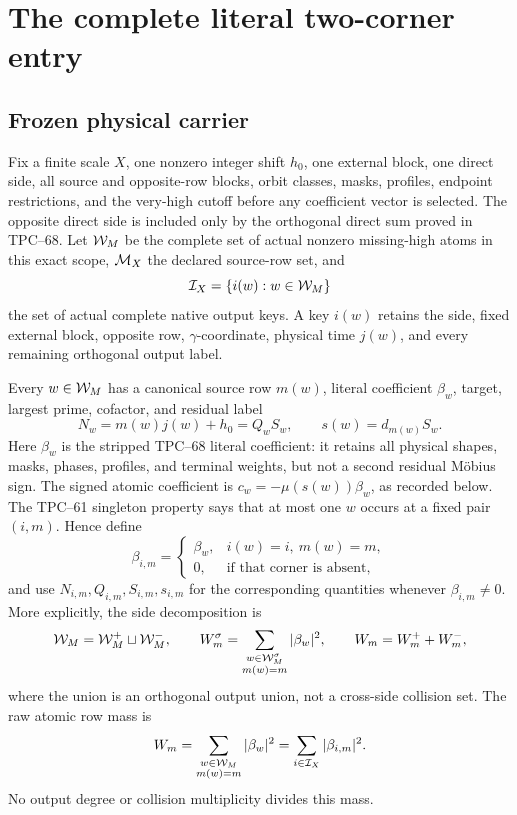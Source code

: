 \section{The complete literal two-corner entry}
\label{sec:literal-entry}

\subsection{Frozen physical carrier}

Fix a finite scale \(X\), one nonzero integer shift \(h_0\), one external
block, one direct side, all source and opposite-row blocks, orbit classes,
masks, profiles, endpoint restrictions, and the very-high cutoff before
any coefficient vector is selected.  The opposite direct side is included
only by the orthogonal direct sum proved in TPC--68.  Let \(\mathcal W_M\) be
the complete set of actual nonzero missing-high atoms in this exact scope,
\(\mathcal M_X\) the declared source-row set, and
\[
 \mathcal I_X=\{i(w):w\in\mathcal W_M\}
\]
the set of actual complete native output keys.  A key \(i(w)\) retains
the side, fixed external block, opposite row, \(\gamma\)-coordinate,
physical time \(j(w)\), and every remaining orthogonal output label.

Every \(w\in\mathcal W_M\) has a canonical source row \(m(w)\), literal
coefficient \(\beta_w\), target, largest prime, cofactor, and residual
label
\begin{equation}
 N_w=m(w)j(w)+h_0=Q_wS_w,
 \qquad
 s(w)=d_{m(w)}S_w.
 \label{eq:key-target-residual}
\end{equation}
Here \(\beta_w\) is the stripped TPC--68 literal coefficient: it retains
all physical shapes, masks, phases, profiles, and terminal weights, but
not a second residual M\"obius sign.  The signed atomic coefficient is
\(c_w=-\mu(s(w))\beta_w\), as recorded below.
The TPC--61 singleton property says that at most one \(w\) occurs at a
fixed pair \((i,m)\).  Hence define
\[
 \beta_{i,m}=
 \begin{cases}
  \beta_w,&i(w)=i,\ m(w)=m,\\
  0,&\text{if that corner is absent},
 \end{cases}
\]
and use \(N_{i,m},Q_{i,m},S_{i,m},s_{i,m}\) for the corresponding
quantities whenever \(\beta_{i,m}\ne0\).
More explicitly, the side decomposition is
\[
 \mathcal W_M=\mathcal W_M^+\sqcup\mathcal W_M^-,
 \qquad
 W_m^\sigma
 =\sum_{\substack{w\in\mathcal W_M^\sigma\\m(w)=m}}|\beta_w|^2,
 \qquad
 W_m=W_m^++W_m^-,
\]
where the union is an orthogonal output union, not a cross-side collision
set.
The raw atomic row mass is
\begin{equation}
 W_m
 =\sum_{\substack{w\in\mathcal W_M\\m(w)=m}}|\beta_w|^2
 =\sum_{i\in\mathcal I_X}|\beta_{i,m}|^2.
 \label{eq:raw-row-mass}
\end{equation}
No output degree or collision multiplicity divides this mass.

